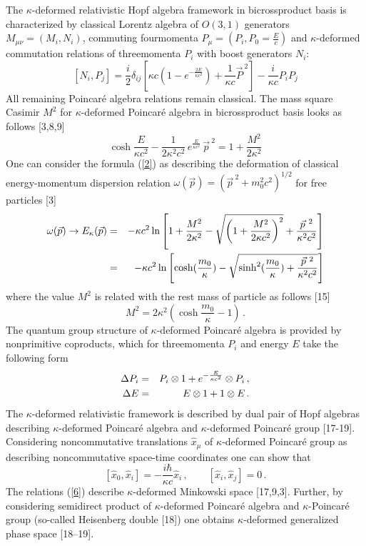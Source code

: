 \documentclass[a4paper,12pt]{article}
\begin{document}
The $\kappa$-deformed relativistic Hopf algebra framework in
bicrossproduct basis is characterized by classical Lorentz algebra
of $O(3,1)$ generators $M_{\mu\nu}=(M_i, N_i)$, commuting
fourmomenta $P_\mu=(P_i, P_0 = \frac{E}{c})$ and $\kappa$-deformed
commutation relations of threemomenta $P_i$ with boost generators
$N_i$:
\begin{equation}\label{1}
  [N_i, P_j] = \frac{i}{2} \delta_{ij}
  \left[ \kappa c (1 - e ^{ -\frac{2E}{\kappa c^2} })+ \frac{1}{\kappa
  c}\vec{P}^{\ 2}\right] - \frac{i}{\kappa c}P_i P _j
\end{equation}
All remaining Poincar\'{e} algebra relations remain classical. The mass square
Casimir $M^2$ for $\kappa$-deformed Poincar\'{e} algebra in bicrossproduct
basis  looks as follows [3,8,9]
\begin{equation}\label{2}
  \cosh \frac{E}{\kappa c^2} - \frac{1}{2\kappa^2 c^2}
  \, e^{\frac{E}{\kappa c^2} } \, \vec{p}^{\ 2}
 = 1 + \frac{M^2}{2\kappa^2}
 \end{equation}
One can consider the formula (\ref{2}) as describing the
deformation of classical energy-momentum dispersion relation
$\omega( \vec{p})= ( \vec{p}^{\ 2} + m_0^2 c^2 )^{1/2}$ for free
particles [3]
\begin{eqnarray}\label{3}
  \omega( \vec{p}) \to E_\kappa ( \vec{p}) & = & - \kappa c^2 \ln\left[1 +
  \frac{M^2}{2\kappa^2} - \sqrt{\left(1 +\frac{M^2}{2 \kappa c^2}\right)^2} +
  \frac{\vec{p}^{\ 2}}{\kappa^2 c^2}\right]
  \cr
&  = & - \kappa c^2\ln\left[\cosh(\frac{m_0}{\kappa}) - \sqrt{\sinh^2
(\frac{m_0}{\kappa}) +
  \frac{\vec{p}^{\ 2}}{\kappa^2 c^2}}\right]
\end{eqnarray}
where the value $M^2$ is related with the rest mass of particle as follows
[15]
\begin{equation}\label{4}
  M^2 = 2 \kappa^2 (\cosh \frac{m_0}{\kappa} -  1 ) \, .
\end{equation}
The quantum group structure of $\kappa$-deformed Poincar\'{e} algebra is
provided by nonprimitive  coproducts, which for threemomenta $P_i$ and energy
$E$ take the  following form
\begin{eqnarray}\label{5}
  \Delta P_i &= & P_i \otimes 1 + e^ { - \frac{E}{\kappa c^2} }
  \otimes P_i\, ,
  \cr
\Delta E &= & E \otimes 1 + 1 \otimes  E \, .
\end{eqnarray}
The $\kappa$-deformed relativistic framework is  described by dual
pair of Hopf algebras describing $\kappa$-deformed Poincar\'{e}
algebra and $\kappa$-deformed  Poincar\'{e} group [17-19].
Considering noncommutative translations $\widehat{x}_{\mu}$ of
$\kappa$-deformed Poincar\'{e} group as describing noncommutative
space-time coordinates one can show that
\begin{equation}\label{6}
\left[ \widehat{x}_0, \widehat{x}_i \right] = -\frac{i
\hbar}{\kappa c} \widehat{x}_i\, , \qquad \left[ \widehat{x}_i,
\widehat{x}_j \right] = 0 \, .
\end{equation}
The relations  (\ref{6}) describe $\kappa$-deformed Minkowski
space [17,9,3]. Further, by considering semidirect product of
$\kappa$-deformed Poincar\'{e} algebra and $\kappa$-Poincar\'{e}
group (so-called Heisenberg double [18])  one obtains
$\kappa$-deformed generalized phase space [18--19].
\end{document}
